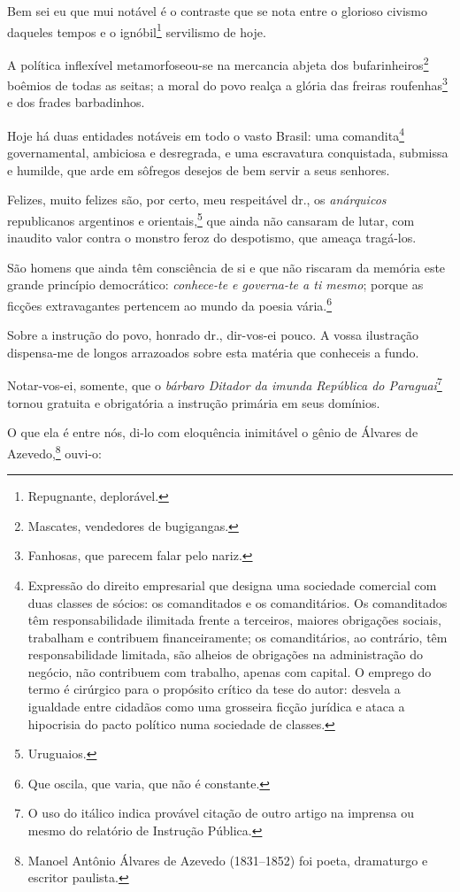 Bem sei eu que mui notável é o contraste que se nota entre o glorioso
civismo daqueles tempos e o ignóbil\footnote{Repugnante, deplorável.}
servilismo de hoje.

A política inflexível metamorfoseou-se na mercancia abjeta dos
bufarinheiros\footnote{Mascates, vendedores de bugigangas.} boêmios de
todas as seitas; a moral do povo realça a glória das freiras
roufenhas\footnote{Fanhosas, que parecem falar pelo nariz.} e dos
frades barbadinhos.

Hoje há duas entidades notáveis em todo o vasto Brasil: uma
comandita\footnote{Expressão do direito empresarial que designa uma
  sociedade comercial com duas classes de sócios: os comanditados e os
  comanditários. Os comanditados têm responsabilidade ilimitada frente a
  terceiros, maiores obrigações sociais, trabalham e contribuem
  financeiramente; os comanditários, ao contrário, têm responsabilidade
  limitada, são alheios de obrigações na administração do negócio, não
  contribuem com trabalho, apenas com capital. O emprego do termo é
  cirúrgico para o propósito crítico da tese do autor: desvela a
  igualdade entre cidadãos como uma grosseira ficção jurídica e ataca a
  hipocrisia do pacto político numa sociedade de classes.}
governamental, ambiciosa e desregrada, e uma escravatura conquistada,
submissa e humilde, que arde em sôfregos desejos de bem servir a seus
senhores.

Felizes, muito felizes são, por certo, meu respeitável dr., os
\emph{anárquicos} republicanos argentinos e orientais,\footnote{
  Uruguaios.} que ainda não cansaram de lutar, com inaudito valor
contra o monstro feroz do despotismo, que ameaça tragá-los.

São homens que ainda têm consciência de si e que não riscaram da memória
este grande princípio democrático: \emph{conhece-te e governa-te a ti
mesmo}; porque as ficções extravagantes pertencem ao mundo da poesia
vária.\footnote{Que oscila, que varia, que não é constante.}

Sobre a instrução do povo, honrado dr., dir-vos-ei pouco. A vossa
ilustração dispensa-me de longos arrazoados sobre esta matéria que
conheceis a fundo.

Notar-vos-ei, somente, que o \emph{bárbaro Ditador da imunda República
do Paraguai}\footnote{O uso do itálico indica provável citação de
  outro artigo na imprensa ou mesmo do relatório de Instrução Pública.}
tornou gratuita e obrigatória a instrução primária em seus domínios.

O que ela é entre nós, di-lo com eloquência inimitável o gênio de
Álvares de Azevedo,\footnote{Manoel Antônio Álvares de Azevedo
  (1831--1852) foi poeta, dramaturgo e escritor paulista.} ouvi-o:

